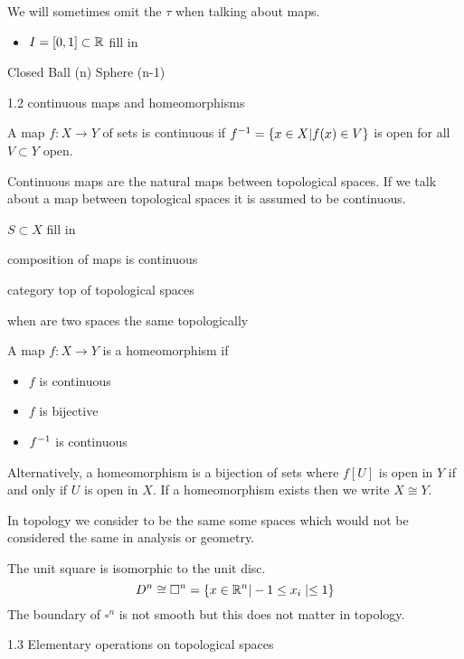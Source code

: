 We will sometimes omit the $\tau$ when talking about maps.

\begin{exam}
	\begin{itemize}
		\item $I = [0,1] \subset \mathbb{R}$ fill in
	\end{itemize}
	Closed Ball (n)
	Sphere (n-1)	
\end{exam}

1.2 continuous maps and homeomorphisms

\begin{defn}
	A map $f: X \to Y$ of sets is continuous if $f^{-1} = \{x \in X | f(x) \in V\}$ is open for all $V \subset Y$ open.
\end{defn}

Continuous maps are the natural maps between topological spaces.
If we talk about a map between topological spaces it is assumed to be continuous.

\begin{exam}
	$S \subset X$ fill in
\end{exam}

composition of maps is continuous

category top of topological spaces

when are two spaces the same topologically

\begin{defn}
	A map $f: X \to Y$ is a homeomorphism if
	\begin{itemize}
		\item $f$ is continuous
		\item $f$ is bijective
		\item $f^{-1}$ is continuous
	\end{itemize}
	Alternatively, a homeomorphism is a bijection of sets where $f[U]$ is open in $Y$ if and only if $U$ is open in $X$.
	If a homeomorphism exists then we write $X \cong Y$.
\end{defn}

In topology we consider to be the same some spaces which would not be considered the same in analysis or geometry.

\begin{exam}
	The unit square is isomorphic to the unit disc.
	\[D^n \cong \square^n = \{x \in \mathbb{R}^n | -1 \leq x_i \mid \leq 1\}\]
	The boundary of $\square^n$ is not smooth but this does not matter in topology.
\end{exam}

1.3 Elementary operations on topological spaces

